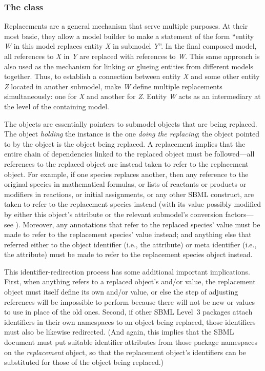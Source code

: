 \subsubsection{The  class}
\label{replacedelement-class}
\label{listofreplacedelements-class}

Replacements are a general mechanism that serve multiple purposes.  At
their most basic, they allow a model builder to make a statement of the
form ``entity \emph{W} in this model replaces entity \emph{X} in
submodel \emph{Y}''.  In the final composed model, all references to
\emph{X} in \emph{Y} are replaced with references to \emph{W}.  This
same approach is also used as the mechanism for linking or glueing
entities from different models together.  Thus, to establish a
connection between entity \emph{X} and some other entity \emph{Z}
located in another submodel, make \emph{W} define multiple replacements
simultaneously: one for \emph{X} and another for \emph{Z}.  Entity
\emph{W} acts as an intermediary at the level of the containing model.

The \ReplacedElement objects are essentially pointers to submodel
objects that are being replaced.  The object \emph{holding} the
\ReplacedElement instance is the one \emph{doing the replacing}; the
object pointed to by the \ReplacedElement object is the object being
replaced.  A replacement implies that the entire chain of dependencies
linked to the replaced object must be followed---all references to the
replaced object are instead taken to refer to the replacement object.
For example, if one species replaces another, then any reference to the
original species in mathematical formulas, or lists of reactants or
products or modifiers in reactions, or initial assignments, or any other
SBML construct, are taken to refer to the replacement species instead
(with its value possibly modified by either this object's
 attribute or the relevant submodel's conversion
factors---see ).  Moreover, any annotations
that refer to the replaced species'  value must be made to
refer to the replacement species'  value instead; and
anything else that referred either to the object identifier (i.e., the
 attribute) or meta identifier (i.e., the 
attribute) must be made to refer to the replacement species object
instead.  

This identifier-redirection process has some additional important
implications.  First, when anything refers to a replaced object's
 and/or  value, the replacement object must
itself define its own  and/or  value, or else
the step of adjusting references will be impossible to perform because
there will not be new  or  values to use in
place of the old ones.  Second, if other SBML Level~3 packages attach
identifiers in their own namespaces to an object being replaced, those
identifiers must also be likewise redirected.  (And again, this implies
that the SBML document must put suitable identifier attributes from
those package namespaces on the \emph{replacement} object, so that the
replacement object's identifiers can be substituted for those of the
object being replaced.)

